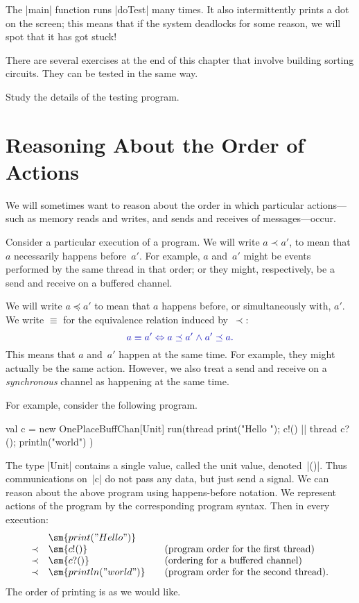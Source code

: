 The |main| function  runs |doTest| many times.
%
It also intermittently prints a dot on the screen; this means that if the
system deadlocks for some reason, we will spot that it has got stuck!

There are several exercises at the end of this chapter that involve building
sorting circuits.  They can be tested in the same way.
%
\begin{instruction}
Study the details of the testing program.
\end{instruction}


\section{Reasoning About the Order of Actions}

We will sometimes want to reason about the order in which particular
actions---such as memory reads and writes, and sends and receives of
messages---occur.

Consider a particular execution of a program.  We will write $a \prec a'$, to
mean that $a$ necessarily happens before~$a'$.  For example, $a$ and~$a'$
might be events performed by the same thread in that order; or they might,
respectively, be a send and receive on a buffered channel.

We will write $a \preceq a'$ to mean that $a$ happens before, or
simultaneously with, $a'$.  
%
We write $\equiv$ for the equivalence relation induced by~$\prec$:
\[\mstyle
a \equiv a' \iff a \preceq a' \land a' \preceq a.
\]
This means that $a$ and~$a'$ happen at the same time.  For example, they might
actually be the same action.  However, we also treat a send and receive on a
\emph{synchronous} channel as happening at the same time.

For example, consider the following program.
\begin{scala}
  val c = new OnePlaceBuffChan[Unit]
  run(thread{ print("Hello "); c!() } || thread{ c?(); println("world") })
\end{scala}
%
The type |Unit| contains a single value, called the unit value, denoted~|()|.
Thus communications on~|c| do not pass any data, but just send a signal.
%
We can reason about the above program using happens-before notation.  We
represent actions of the program by the corresponding program syntax.  Then in
every execution:
\[
\begin{array}{cl@{\qquad}l}
& \sm{print("Hello ")} \\
\prec & \sm{c!()} & \mbox{(program order for the first thread)} \\
\prec & \sm{c?()} & \mbox{(ordering for a buffered channel)} \\
\prec & \sm{println("world")} & \mbox{(program order for the second thread).}
\end{array}
\]
The order of printing is as we would like. 

